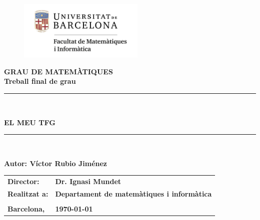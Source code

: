 \documentclass[11pt,a4paper,openright,oneside]{book}
\numberwithin{equation}{section}
\theoremstyle{definition}
\begin{document}

\thispagestyle{empty}

\begin{titlepage}
\begin{center}
\begin{figure}[htb]
\begin{center}
\includegraphics[width=6cm]{matematiquesinformatica-pos-rgb.png}
\end{center}
\end{figure}

\vspace*{1cm}
\textbf{\LARGE GRAU DE MATEM\`{A}TIQUES } \\
\vspace*{.5cm}
\textbf{\LARGE Treball final de grau} \\

\vspace*{1.5cm}
\rule{16cm}{0.1mm}\\
\begin{Huge}
\textbf{EL MEU TFG} \\
\end{Huge}
\rule{16cm}{0.1mm}\\

\vspace{1cm}

\begin{flushright}
\textbf{\LARGE Autor: Víctor Rubio Jiménez}

\vspace*{2cm}

\renewcommand{\arraystretch}{1.5}
\begin{tabular}{ll}
\textbf{\Large Director:} & \textbf{\Large Dr. Ignasi Mundet } \\
\textbf{\Large Realitzat a:} & \textbf{\Large  Departament de matemàtiques i informàtica   } \\
\\
\textbf{\Large Barcelona,} & \textbf{\Large \today }
\end{tabular}

\end{flushright}

\end{center}










\end{titlepage}
\end{document}

